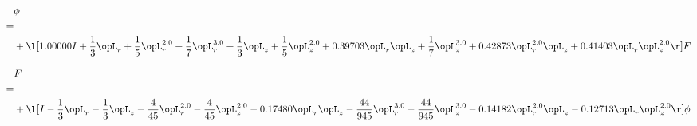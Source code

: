 \begin{alignat}{2} 
\label{eq:scalarFlux_1} 
& \phi \nonumber \\ 
 = \\ 
& + \l[  1.00000 I + \frac{1}{3} \opL_r + \frac{1}{5} \opL_r^{2.0} + \frac{1}{7} \opL_r^{3.0} + \frac{1}{3} \opL_z + \frac{1}{5} \opL_z^{2.0} +  0.39703 \opL_r \opL_z + \frac{1}{7} \opL_z^{3.0} +  0.42873 \opL_r^{2.0} \opL_z +  0.41403 \opL_r \opL_z^{2.0}  \r] F \nonumber \\ 
\end{alignat} 


\begin{alignat}{2} 
\label{eq:transport3D_0} 
& F \nonumber \\ 
 = \\ 
& + \l[ I - \frac{1}{3} \opL_r - \frac{1}{3} \opL_z - \frac{4}{45} \opL_r^{2.0} - \frac{4}{45} \opL_z^{2.0}   -0.17480 \opL_r \opL_z - \frac{44}{945} \opL_r^{3.0} - \frac{44}{945} \opL_z^{3.0}   -0.14182 \opL_r^{2.0} \opL_z   -0.12713 \opL_r \opL_z^{2.0}  \r] \phi \nonumber \\ 
\end{alignat} 


